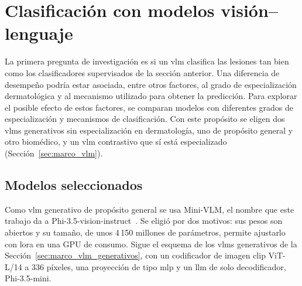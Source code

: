 \section{Clasificación con modelos visión--lenguaje}
\label{sec:met_clasif_vlm}

La primera pregunta de investigación es si un \gls{vlm} clasifica las lesiones tan bien como los clasificadores
supervisados de la sección anterior. Una diferencia de desempeño podría estar asociada, entre otros factores, al grado de especialización dermatológica y al mecanismo utilizado para obtener la predicción. Para explorar el posible efecto de estos factores, se comparan modelos con diferentes grados de especialización y mecanismos de clasificación. Con este propósito se eligen dos
\glspl{vlm} generativos sin especialización en dermatología, uno de propósito general y otro biomédico, y un
\gls{vlm} contrastivo que sí está especializado (Sección~\ref{sec:marco_vlm}).

\subsection{Modelos seleccionados}
\label{sec:met_vlm_generativos}

Como \gls{vlm} generativo de propósito general se usa Mini-VLM, el nombre que este trabajo da a
Phi-3.5-vision-instruct~\cite{abdin2024phi3}. Se eligió por dos motivos: sus pesos son abiertos y su tamaño, de unos
4\,150 millones de parámetros, permite ajustarlo con \gls{lora} en una GPU de consumo. Sigue el esquema de los
\glspl{vlm} generativos de la Sección~\ref{sec:marco_vlm_generativos}, con un codificador de imagen \gls{clip}
ViT-L/14 a 336 píxeles, una proyección de tipo \gls{mlp} y un \gls{llm} de solo decodificador, Phi-3.5-mini.

